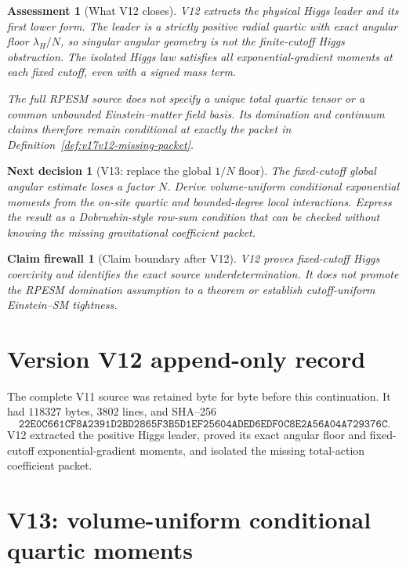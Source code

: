 \documentclass[11pt]{article}
\newtheorem{firewall}[theorem]{Claim firewall}
\newtheorem{decision}[theorem]{Next decision}
\newtheorem{assessment}[theorem]{Assessment}
\theoremstyle{remark}
\begin{document}
\begin{assessment}[What V12 closes]
\label{ass:v17v12-status}
V12 extracts the physical Higgs leader and its first lower form.
The leader is a strictly positive radial quartic with exact angular
floor \(\lambda_H/N\), so singular angular geometry is not the
finite-cutoff Higgs obstruction.  The isolated Higgs law satisfies
all exponential-gradient moments at each fixed cutoff, even with a
signed mass term.

The full RPESM source does not specify a unique total quartic tensor
or a common unbounded Einstein--matter field basis.  Its domination
and continuum claims therefore remain conditional at exactly the
packet in Definition~\ref{def:v17v12-missing-packet}.
\end{assessment}

\begin{decision}[V13: replace the global \(1/N\) floor]
\label{dec:v17v12-next}
The fixed-cutoff global angular estimate loses a factor \(N\).
Derive volume-uniform conditional exponential moments from the
on-site quartic and bounded-degree local interactions.  Express the
result as a Dobrushin-style row-sum condition that can be checked
without knowing the missing gravitational coefficient packet.
\end{decision}

\begin{firewall}[Claim boundary after V12]
\label{fire:v17v12}
V12 proves fixed-cutoff Higgs coercivity and identifies the exact
source underdetermination.  It does not promote the RPESM
domination assumption to a theorem or establish cutoff-uniform
Einstein--SM tightness.
\end{firewall}

\section*{Version V12 append-only record}
The complete V11 source was retained byte for byte before this
continuation.  It had \(118327\) bytes, \(3802\) lines, and SHA--256
\[
 \texttt{22E0C661CF8A2391D2BD2865F3B5D1EF25604ADED6EDF0C8E2A56A04A729376C}.
\]
V12 extracted the positive Higgs leader, proved its exact angular
floor and fixed-cutoff exponential-gradient moments, and isolated
the missing total-action coefficient packet.


\section{V13: volume-uniform conditional quartic moments}
\label{sec:v17v13}
\end{document}
